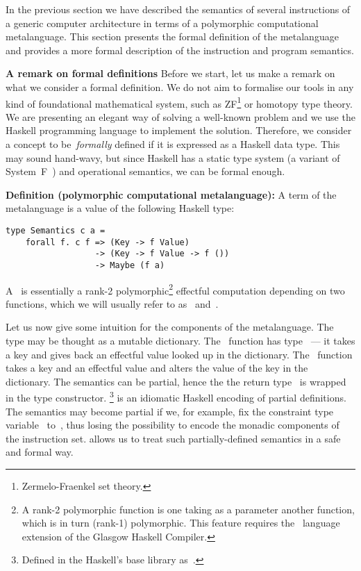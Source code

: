 
In the previous section we have described the semantics of several instructions of
a generic computer architecture in terms of a polymorphic computational metalanguage.
This section presents the formal definition of the metalanguage and provides a more
formal description of the instruction and program semantics.

\textbf{A remark on formal definitions}
Before we start, let us make a remark on what we consider a formal definition.
We do not aim to formalise our tools in any kind of foundational mathematical system,
such as ZF\footnote{Zermelo-Fraenkel set theory.} or homotopy type theory. We are
presenting an elegant way of solving a well-known problem and we use the Haskell
programming language to implement the solution. Therefore, we consider a concept
to be~\emph{formally} defined if it is expressed as a Haskell data type. This may
sound hand-wavy, but since Haskell has a static type system (a variant of
System~F~\cite{Sulzmann:2007:SFT:1190315.1190324}) and operational semantics, we
can be formal enough.

\textbf{Definition (polymorphic computational metalanguage):\label{def:metalanguage}}
A term of the metalanguage is a value of the following Haskell type:

\begin{verbatim}
type Semantics c a =
    forall f. c f => (Key -> f Value)
                  -> (Key -> f Value -> f ())
                  -> Maybe (f a)
\end{verbatim}

\noindent A~ is essentially a rank-2 polymorphic\footnote{A rank-2 polymorphic
function is one taking as a parameter another function, which is in turn (rank-1)
polymorphic. This feature requires the~ language extension of the
Glasgow Haskell Compiler.}
effectful computation depending on two functions,
which we will usually refer to as~ and~.

Let us now give some intuition for the components of the metalanguage.
The~
type may be thought as a mutable dictionary. The~ function has
type~ --- it takes
a key and gives back an effectful value looked up in the dictionary. The~
function takes a key and an effectful value and alters the value of the key in
the dictionary. The semantics can be partial, hence the the return type~
is wrapped in the  type constructor.
\footnote{Defined in the Haskell's \textsf{base} library as~.}
is an idiomatic Haskell encoding of partial definitions. The semantics may
become partial if we, for example, fix the constraint type variable~
to~, thus losing the possibility to encode the monadic
components of the instruction set.  allows us to treat such
partially-defined semantics in a safe and formal way.

